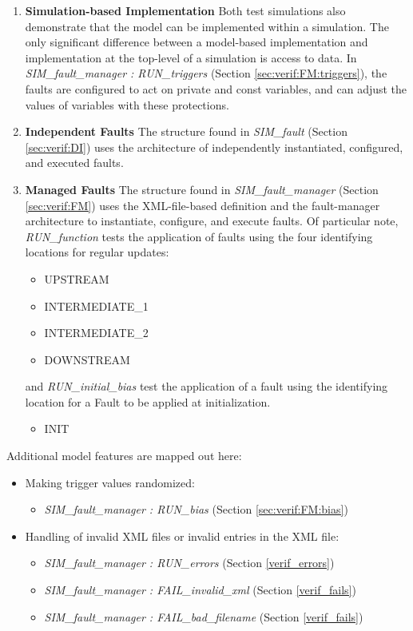 \documentclass[11pt,fleqn]{report}
\begin{document}
\begin{flushleft}
\begin{enumerate}
   \item \textbf{Simulation-based Implementation} Both test simulations also
     demonstrate that the model can be implemented within a simulation.
     The only significant difference between a model-based implementation
     and implementation at the top-level of a simulation is access to data.
     In \textit{SIM\_fault\_manager : RUN\_triggers} (Section
     \ref{sec:verif:FM:triggers}), the faults are configured to
     act on private and const variables, and can adjust the values of
     variables with these protections.

   \item \textbf{Independent Faults} The structure found in \textit{SIM\_fault}
     (Section \ref{sec:verif:DI}) uses the architecture of independently
     instantiated, configured, and executed faults.

   \item \textbf{Managed Faults} The structure found in
     \textit{SIM\_fault\_manager} (Section \ref{sec:verif:FM})
     uses the XML-file-based definition and the fault-manager architecture to
     instantiate, configure, and execute faults.
     Of particular note, \textit{RUN\_function} tests the application of faults
     using the four identifying locations for regular updates:
     \begin{itemize}
      \item UPSTREAM
      \item INTERMEDIATE\_1
      \item INTERMEDIATE\_2
      \item DOWNSTREAM
     \end{itemize}
     and \textit{RUN\_initial\_bias} test the application of a fault using the
     identifying location for a Fault to be applied at initialization.
     \begin{itemize}
      \item INIT
     \end{itemize}
 \end{enumerate}

Additional model features are mapped out here:
\begin{itemize}
 \item Making trigger values randomized:
  \begin{itemize}
   \item \textit{SIM\_fault\_manager : RUN\_bias}
     (Section \ref{sec:verif:FM:bias})
  \end{itemize}
 \item Handling of invalid XML files or invalid entries in the XML file:
  \begin{itemize}
   \item \textit{SIM\_fault\_manager : RUN\_errors}
     (Section \ref{verif_errors})
   \item \textit{SIM\_fault\_manager : FAIL\_invalid\_xml}
      (Section \ref{verif_fails})
   \item \textit{SIM\_fault\_manager : FAIL\_bad\_filename}
     (Section \ref{verif_fails})
  \end{itemize}
\end{itemize}
\end{flushleft}
\end{document}
